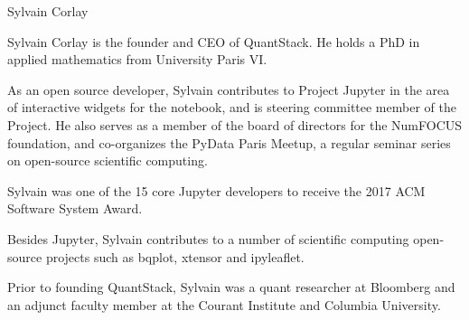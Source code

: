 \begin{participant}[type=leadPI,PM=6,gender=male]{Sylvain Corlay}

  Sylvain Corlay is the founder and CEO of QuantStack. He holds a PhD in applied mathematics from University Paris VI.

  As an open source developer, Sylvain contributes to Project Jupyter in the area of interactive widgets for the notebook, and is steering committee member of the Project. He also serves as a member of the board of directors for the NumFOCUS foundation, and co-organizes the PyData Paris Meetup, a regular seminar series on open-source scientific computing.

  Sylvain was one of the 15 core Jupyter developers to receive the 2017 ACM Software System Award.

  Besides Jupyter, Sylvain contributes to a number of scientific computing open-source projects such as bqplot, xtensor and ipyleaflet.

  Prior to founding QuantStack, Sylvain was a quant researcher at Bloomberg and an adjunct faculty member at the Courant Institute and Columbia University.
\end{participant}

